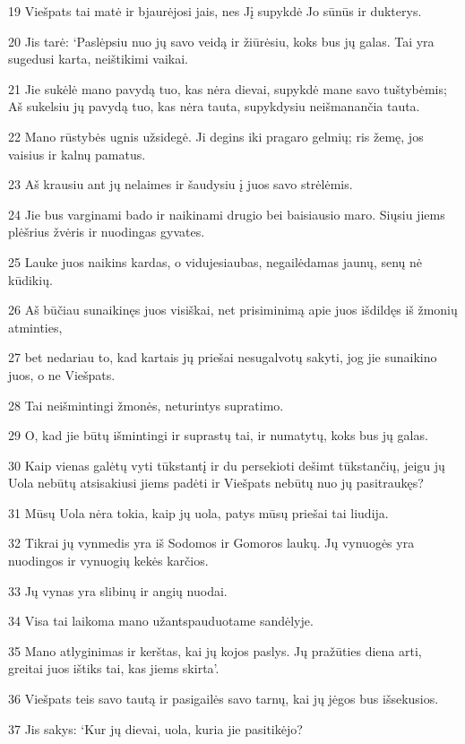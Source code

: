 \par 19 Viešpats tai matė ir bjaurėjosi jais, nes Jį supykdė Jo sūnūs ir dukterys. 
\par 20 Jis tarė: ‘Paslėpsiu nuo jų savo veidą ir žiūrėsiu, koks bus jų galas. Tai yra sugedusi karta, neištikimi vaikai. 
\par 21 Jie sukėlė mano pavydą tuo, kas nėra dievai, supykdė mane savo tuštybėmis; Aš sukelsiu jų pavydą tuo, kas nėra tauta, supykdysiu neišmanančia tauta. 
\par 22 Mano rūstybės ugnis užsidegė. Ji degins iki pragaro gelmių; ris žemę, jos vaisius ir kalnų pamatus. 
\par 23 Aš krausiu ant jų nelaimes ir šaudysiu į juos savo strėlėmis. 
\par 24 Jie bus varginami bado ir naikinami drugio bei baisiausio maro. Siųsiu jiems plėšrius žvėris ir nuodingas gyvates. 
\par 25 Lauke juos naikins kardas, o viduje­siaubas, negailėdamas jaunų, senų nė kūdikių. 
\par 26 Aš būčiau sunaikinęs juos visiškai, net prisiminimą apie juos išdildęs iš žmonių atminties, 
\par 27 bet nedariau to, kad kartais jų priešai nesugalvotų sakyti, jog jie sunaikino juos, o ne Viešpats. 
\par 28 Tai neišmintingi žmonės, neturintys supratimo. 
\par 29 O, kad jie būtų išmintingi ir suprastų tai, ir numatytų, koks bus jų galas. 
\par 30 Kaip vienas galėtų vyti tūkstantį ir du persekioti dešimt tūkstančių, jeigu jų Uola nebūtų atsisakiusi jiems padėti ir Viešpats nebūtų nuo jų pasitraukęs? 
\par 31 Mūsų Uola nėra tokia, kaip jų uola, patys mūsų priešai tai liudija. 
\par 32 Tikrai jų vynmedis yra iš Sodomos ir Gomoros laukų. Jų vynuogės yra nuodingos ir vynuogių kekės karčios. 
\par 33 Jų vynas yra slibinų ir angių nuodai. 
\par 34 Visa tai laikoma mano užantspauduotame sandėlyje. 
\par 35 Mano atlyginimas ir kerštas, kai jų kojos paslys. Jų pražūties diena arti, greitai juos ištiks tai, kas jiems skirta’. 
\par 36 Viešpats teis savo tautą ir pasigailės savo tarnų, kai jų jėgos bus išsekusios. 
\par 37 Jis sakys: ‘Kur jų dievai, uola, kuria jie pasitikėjo? 
